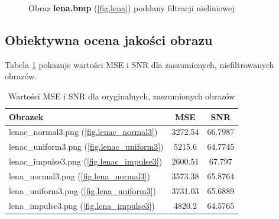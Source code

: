 \documentclass{classrep}
\begin{document}
\begin{figure}
{  \label{fig.lena_rosenfeld_5}
 }
\caption{Obraz \textbf{lena.bmp} (\ref{fig.lena}) poddany filtracji nieliniowej}
\label{fig.lena_rosenfeld}
\end{figure}

\subsection{Obiektywna ocena jakości obrazu}
Tabela \ref{tab.lena_noised} pokazuje wartości MSE i SNR dla zaszumionych, niefiltrowanych obrazów.

\begin{table}
  \centering
  \begin{tabular}{|l|c|c|}
    \hline
    \textbf{Obrazek} & \textbf{MSE} & \textbf{SNR} \\
    \hline\hline
    lenac\_normal3.png (\ref{fig.lenac_normal3}) & 3272.54 & 66.7987 \\
    \hline
    lenac\_uniform3.png (\ref{fig.lenac_uniform3}) & 5215.6 & 64.7745 \\
    \hline
    lenac\_impulse3.png (\ref{fig.lenac_impulse3}) & 2600.51 & 67.797 \\
    \hline
    lena\_normal3.png (\ref{fig.lena_normal3}) & 3573.38 & 65.8764 \\
    \hline
    lena\_uniform3.png (\ref{fig.lena_uniform3}) & 3731.03 & 65.6889 \\
    \hline
    lena\_impulse3.png (\ref{fig.lena_impulse3}) & 4820.2 & 64.5765 \\
    \hline
  \end{tabular}
  \caption{Wartości MSE i SNR dla oryginalnych, zaszumionych obrazów}
  \label{tab.lena_noised}
\end{table}
\end{document}
